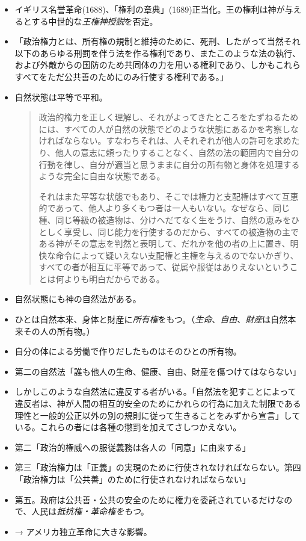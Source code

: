 \documentclass[uplatex,dvipdfmx]{jsarticle} \usepackage{mystyle}%
\begin{document}
\begin{itemize}


\item イギリス名誉革命(1688)、「権利の章典」(1689)正当化。王の権利は神が与えるとする中世的な\emph{王権神授説}を否定。


  
\item 「政治権力とは、所有権の規制と維持のために、死刑、したがって当然それ以下のあらゆる刑罰を伴う法を作る権利であり、またこのような法の執行、および外敵からの国防のため共同体の力を用いる権利であり、しかもこれらすべてをただ公共善のためにのみ行使する権利である。」

\item 自然状態は平等で平和。

  \begin{quote} \small{}政治的権力を正しく理解し、それがよってきたところをたずねるためには、すべての人が自然の状態でどのような状態にあるかを考察しなければならない。すなわちそれは、人それぞれが他人の許可を求めたり、他人の意志に頼ったりすることなく、自然の法の範囲内で自分の行動を律し、自分が適当と思うままに自分の所有物と身体を処理するような完全に自由な状態である。

    それはまた平等な状態でもあり、そこでは権力と支配権はすべて互恵的であって、他人より多くもつ者は一人もいない。なぜなら、同じ種、同じ等級の被造物は、分けへだてなく生をうけ、自然の恵みをひとしく享受し、同じ能力を行使するのだから、すべての被造物の主である神がその意志を判然と表明して、だれかを他の者の上に置き、明快な命令によって疑いえない支配権と主権を与えるのでないかぎり、すべての者が相互に平等であって、従属や服従はありえないということは何よりも明白だからである。
  \end{quote}
  
\item 自然状態にも神の自然法がある。

\item ひとは自然本来、身体と財産に\emph{所有権}をもつ。（\emph{生命}、\emph{自由}、\emph{財産}は自然本来その人の所有物。）
\item 自分の体による労働で作りだしたものはそのひとの所有物。
\item 第二の自然法「誰も他人の生命、健康、自由、財産を傷つけてはならない」
\item しかしこのような自然法に違反する者がいる。「自然法を犯すことによって違反者は、神が人間の相互的安全のためにかれらの行為に加えた制限である理性と一般的公正以外の別の規則に従って生きることをみずから宣言」している。これらの者には各種の懲罰を加えてさしつかえない。
\item 第二「政治的権威への服従義務は各人の「同意」に由来する」
\item 第三「政治権力は「正義」の実現のために行使されなければならない。第四「政治権力は「公共善」のために行使されなければならない」
\item 第五。政府は公共善・公共の安全のために権力を委託されているだけなので、人民は\emph{抵抗権・革命権をもつ}。

\item → アメリカ独立革命に大きな影響。
\end{itemize}
\end{document}

